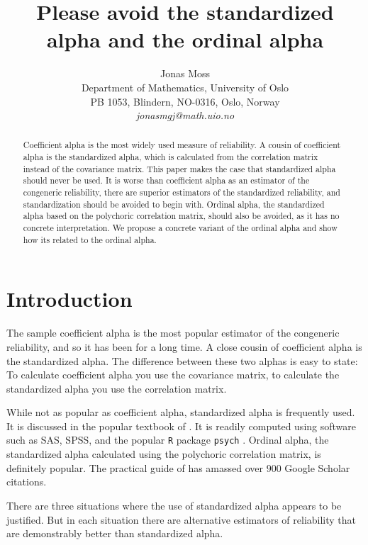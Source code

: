\documentclass[twoside]{article}
\title{Please avoid the standardized alpha and the ordinal alpha}
\author{
  Jonas Moss \orcid{0000-0002-6876-6964} \\
  Department of Mathematics, University of Oslo\\
  PB 1053, Blindern, NO-0316, Oslo, Norway \\
  \it{jonasmgj@math.uio.no}
}
\begin{document}
\maketitle

\begin{abstract}
Coefficient alpha is the most widely used measure of reliability. A cousin of coefficient alpha is the standardized alpha, which is calculated from the correlation matrix instead of the covariance matrix. This paper makes the case that standardized alpha should never be used. It is worse than coefficient alpha as an estimator of the congeneric reliability, there are superior estimators of the standardized reliability, and standardization should be avoided to begin with. Ordinal alpha, the standardized alpha based on the polychoric correlation matrix, should also be avoided, as it has no concrete interpretation. We propose a concrete variant of the ordinal alpha and show how its related to the ordinal alpha.
\end{abstract}


\section{Introduction}

The sample coefficient alpha is the most popular estimator of the congeneric reliability, and so it has been for a long time. A close cousin of coefficient alpha is the standardized alpha. The difference between these two alphas is easy to state: To calculate coefficient alpha you use the covariance matrix, to calculate the standardized alpha you use the correlation matrix. 

While not as popular as coefficient alpha, standardized alpha is frequently used. It is discussed in the popular textbook of \citet[pp. 139--141]{Furr2013-yu}. It is readily computed using software such as SAS, SPSS, and the popular \texttt{R} \citep{Team2013-tt} package \texttt{psych} \citep{psych}. Ordinal alpha, the standardized alpha calculated using the polychoric correlation matrix, is definitely popular. The practical guide of \citet{Gadermann2012-jl} has amassed over $900$ Google Scholar citations.

There are three situations where the use of standardized alpha appears to be justified. But in each situation there are alternative estimators of reliability that are demonstrably better than standardized alpha. 
\end{document}

